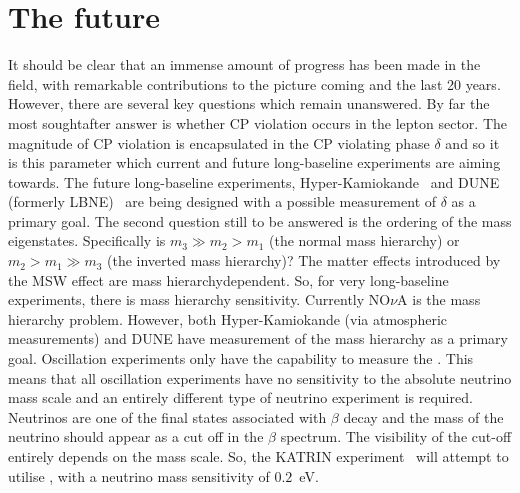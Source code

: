 \section{The future}
\label{sec:NeutrinoFieldFuture}
It should be clear that an immense amount of progress has been made in the field, with remarkable contributions to the picture coming  and the last 20 years.  However, there are several key questions which remain unanswered.  
\newline
\newline
By far the most soughtafter answer is whether CP violation occurs in the lepton sector.  The magnitude of CP violation is encapsulated in the CP violating phase $\delta$ and so it is this parameter which current and future long-baseline experiments are aiming towards.   The future long-baseline experiments, Hyper-Kamiokande~\cite{Abe:2014oxa} and DUNE (formerly LBNE)~\cite{Adams:2013qkq} are being designed with a possible measurement of $\delta$ as a primary goal.
\newline
\newline
The second question still to be answered is the ordering of the mass eigenstates.  Specifically is $m_3 \gg m_2 > m_1$ (the normal mass hierarchy) or $m_2 > m_1 \gg m_3$ (the inverted mass hierarchy)?  The matter effects introduced by the MSW effect are mass hierarchydependent.  So, for very long-baseline experiments, there is mass hierarchy sensitivity.  Currently NO$\nu$A is  the mass hierarchy problem.  However, both Hyper-Kamiokande (via atmospheric measurements) and DUNE have measurement of the mass hierarchy as a primary goal.
\newline
\newline
Oscillation experiments only have the capability to measure the .  This means that all oscillation experiments have no sensitivity to the absolute neutrino mass scale and an entirely different type of neutrino experiment is required.  Neutrinos are one of the final states associated with $\beta$ decay and the mass of the neutrino should appear as a cut off in the $\beta$ spectrum.  The visibility of the cut-off entirely depends on the mass scale.  So, the KATRIN experiment~\cite{Weinheimer2002141} will attempt to utilise , with a neutrino mass sensitivity of $0.2$~eV.
